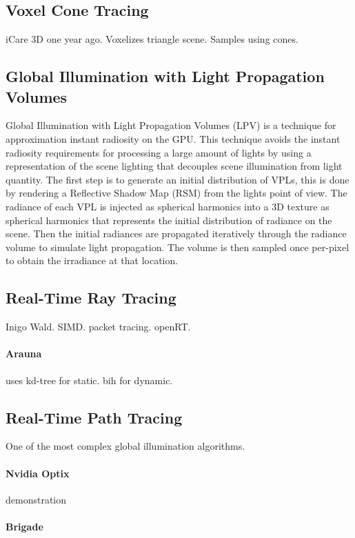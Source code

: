 	\subsection {Voxel Cone Tracing}
		iCare 3D one year ago. Voxelizes triangle scene. Samples using cones. \cite{crassin2011}

	\subsection {Global Illumination with Light Propagation Volumes}

	Global Illumination with Light Propagation Volumes (LPV) is a technique for approximation instant radiosity on the GPU. \cite{kaplanyan2009} This technique avoids the instant radiosity requirements for processing a large amount of lights by using a representation of the scene lighting that decouples scene illumination from light quantity. The first step is to generate an initial distribution of VPLs, this is done by rendering a Reflective Shadow Map (RSM) \cite{dachsbacher2005} from the lights point of view. The radiance of each VPL is injected as spherical harmonics into a 3D texture as spherical harmonics that represents the initial distribution of radiance on the scene. Then the initial radiances are propagated iteratively through the radiance volume to simulate light propagation. The volume is then sampled once per-pixel to obtain the irradiance at that location.

\subsection {Real-Time Ray Tracing}
	Inigo Wald. SIMD. packet tracing. openRT. 
	\paragraph{Arauna} uses kd-tree for static. bih for dynamic.

\subsection {Real-Time Path Tracing}
	One of the most complex global illumination algorithms. 
	\paragraph {Nvidia Optix} demonstration
	\paragraph {Brigade} 
